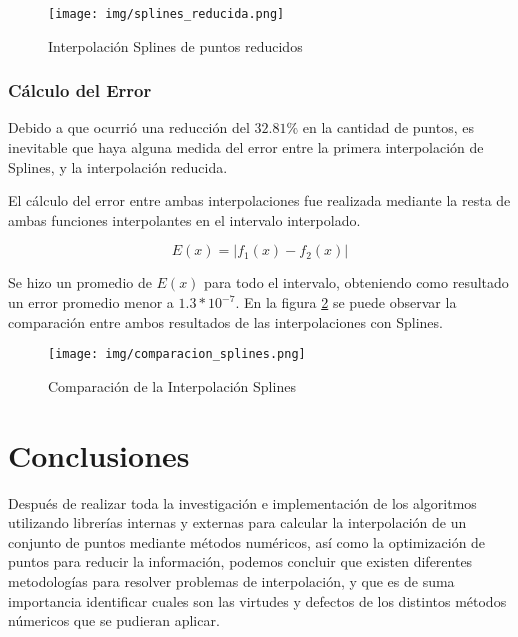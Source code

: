 \documentclass[conference]{IEEEtran}
\begin{document}
\begin{figure}[ht!]
\centering
\texttt{[image: img/splines\_reducida.png]}
\vspace{-1em}
\caption{Interpolación Splines de puntos reducidos}
\label{fig:splines-reducida}
\end{figure}

\subsubsection{Cálculo del Error}

Debido a que ocurrió una reducción del $32.81\%$ en la cantidad de puntos, es inevitable que haya alguna medida del error entre la primera interpolación de Splines, y la interpolación reducida. \par

El cálculo del error entre ambas interpolaciones fue realizada mediante la resta de ambas funciones interpolantes en el intervalo interpolado. \par

\[ E(x)=|f_1(x) - f_2(x)|\]

Se hizo un promedio de $E(x)$ para todo el intervalo, obteniendo como resultado un error promedio menor a $1.3*10^{-7}$. En la figura \ref{fig:comparacion-splines} se puede observar la comparación entre ambos resultados de las interpolaciones con Splines. \par

\begin{figure}[ht!]
\centering
\texttt{[image: img/comparacion\_splines.png]}
\vspace{-1em}
\caption{Comparación de la Interpolación Splines}
\label{fig:comparacion-splines}
\end{figure}

\section{Conclusiones}

Después de realizar toda la investigación e implementación de los algoritmos utilizando librerías internas y externas para calcular la interpolación de un conjunto de puntos mediante métodos numéricos, así como la optimización de puntos para reducir la información, podemos concluir que existen diferentes metodologías para resolver problemas de interpolación, y que es de suma importancia identificar cuales son las virtudes y defectos de los distintos métodos númericos que se pudieran aplicar. \par
\end{document}
